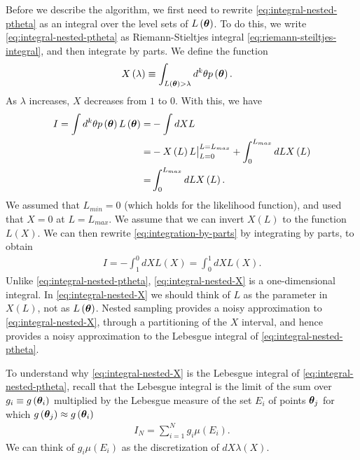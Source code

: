 Before we describe the algorithm, we first need to rewrite \eqref{eq:integral-nested-ptheta}
as an integral over the level sets of $L\left({\bm \theta}\right)$.
To do this, we write \eqref{eq:integral-nested-ptheta} as Riemann-Stieltjes integral
\eqref{eq:riemann-steiltjes-integral}, and then integrate by parts.
We define the function
\begin{align}
    \label{eq:F-NS-int}
    X\left(\lambda\right)
    &\equiv
    \int_{L\left({\bm \theta}\right)>\lambda} d^k\theta p\left({\bm \theta}\right)
    .
\end{align}
As $\lambda$ increases, $X$ decreases from $1$ to $0$.
With this, we have
\begin{align}
    \label{eq:integration-by-parts}
    I
    =
    \int d^k \theta p\left({\bm \theta}\right) L\left({\bm \theta}\right)
    =&
    -
    \int dX L
    \nonumber\\
    =&
    -
    X\left(L\right) L\big|_{L=0}^{L=L_{max}}
    +
    \int_0^{L_{max}} dL X\left(L\right)
    \nonumber\\
    =&
    \int_0^{L_{max}} dL X\left(L\right)
    .
\end{align}
We assumed that $L_{min}=0$ (which holds for the likelihood function), and used that $X=0$ at $L=L_{max}$. 
We assume that we can invert $X\left(L\right)$ to the function $L\left(X\right)$.
We can then rewrite \eqref{eq:integration-by-parts} by integrating by parts, to obtain
\begin{align}
    \label{eq:integral-nested-X}
    I
    =
    -
    \int_1^0 dX L\left(X\right)
    =
    \int_0^1 dX L\left(X\right)
    .
\end{align}
Unlike \eqref{eq:integral-nested-ptheta}, \eqref{eq:integral-nested-X}
is a one-dimensional integral. 
In \eqref{eq:integral-nested-X} we should think of $L$ as the parameter
in $X\left(L\right)$, not as $L\left({\bm \theta}\right)$.
Nested sampling provides a noisy approximation to \eqref{eq:integral-nested-X},
through a partitioning of the $X$ interval, and hence provides a noisy approximation
to the Lebesgue integral of \eqref{eq:integral-nested-ptheta}.

To understand why \eqref{eq:integral-nested-X} 
is the Lebesgue integral of \eqref{eq:integral-nested-ptheta},
recall that the Lebesgue integral is the limit of the sum over 
$g_i\equiv g\left({\bm \theta}_i\right)$
multiplied by the Lebesgue measure of the set $E_i$ of points ${\bm \theta}_j$ for which
$g\left({\bm \theta}_j\right)\approx g\left({\bm \theta}_i\right)$
\begin{align}
    \label{eq:lebesgue-sum}
    I_N
    =
    \sum_{i=1}^N g_i \mu\left(E_i\right)
    .
\end{align}
We can think of $g_i \mu\left(E_i\right)$ as the discretization of $dX \lambda\left(X\right)$.

